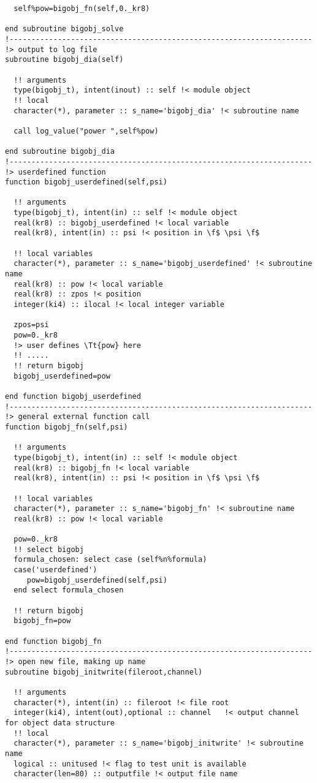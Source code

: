 \begin{verbatim}
  self%pow=bigobj_fn(self,0._kr8)

end subroutine bigobj_solve
!---------------------------------------------------------------------
!> output to log file
subroutine bigobj_dia(self)

  !! arguments
  type(bigobj_t), intent(inout) :: self !< module object
  !! local
  character(*), parameter :: s_name='bigobj_dia' !< subroutine name

  call log_value("power ",self%pow)

end subroutine bigobj_dia
!---------------------------------------------------------------------
!> userdefined function
function bigobj_userdefined(self,psi)

  !! arguments
  type(bigobj_t), intent(in) :: self !< module object
  real(kr8) :: bigobj_userdefined !< local variable
  real(kr8), intent(in) :: psi !< position in \f$ \psi \f$

  !! local variables
  character(*), parameter :: s_name='bigobj_userdefined' !< subroutine name
  real(kr8) :: pow !< local variable
  real(kr8) :: zpos !< position
  integer(ki4) :: ilocal !< local integer variable

  zpos=psi
  pow=0._kr8
  !> user defines \Tt{pow} here
  !! .....
  !! return bigobj
  bigobj_userdefined=pow

end function bigobj_userdefined
!---------------------------------------------------------------------
!> general external function call
function bigobj_fn(self,psi)

  !! arguments
  type(bigobj_t), intent(in) :: self !< module object
  real(kr8) :: bigobj_fn !< local variable
  real(kr8), intent(in) :: psi !< position in \f$ \psi \f$

  !! local variables
  character(*), parameter :: s_name='bigobj_fn' !< subroutine name
  real(kr8) :: pow !< local variable

  pow=0._kr8
  !! select bigobj
  formula_chosen: select case (self%n%formula)
  case('userdefined')
     pow=bigobj_userdefined(self,psi)
  end select formula_chosen

  !! return bigobj
  bigobj_fn=pow

end function bigobj_fn
!---------------------------------------------------------------------
!> open new file, making up name
subroutine bigobj_initwrite(fileroot,channel)

  !! arguments
  character(*), intent(in) :: fileroot !< file root
  integer(ki4), intent(out),optional :: channel   !< output channel for object data structure
  !! local
  character(*), parameter :: s_name='bigobj_initwrite' !< subroutine name
  logical :: unitused !< flag to test unit is available
  character(len=80) :: outputfile !< output file name


\end{verbatim}
